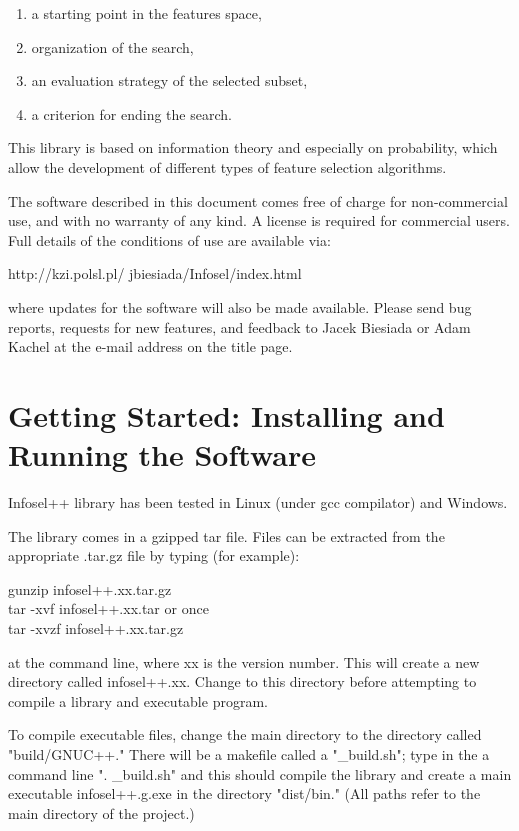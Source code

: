 \documentclass[a4paper,fleqn]{report}
\begin{document}
\begin{enumerate}
\item a starting point in the features space,
\item organization of the search,
\item an evaluation strategy of the selected subset,
\item a criterion for ending the search.
\end{enumerate}

This library is based on information theory and especially on probability, 
which allow the development of different types of feature selection algorithms.

The software described in this document comes free of charge for 
non-commercial use, and with no warranty of any kind. A license is required for commercial users.
Full details of the conditions of use are available via:
%
\begin{center}
http://kzi.polsl.pl/ jbiesiada/Infosel/index.html
\end{center}
%
where updates for the software will also be made available. 
Please send bug reports, requests for new features, and feedback 
to Jacek Biesiada or Adam Kachel at the e-mail address on the title page.


\chapter{Getting Started: Installing and Running the Software}

Infosel++ library has been tested in Linux (under gcc compilator) and Windows.

The library comes in a gzipped tar file. Files can be extracted from the appropriate
.tar.gz file by typing (for example):
\begin{center}
gunzip infosel++.xx.tar.gz \\
tar -xvf infosel++.xx.tar or once \\ 
tar -xvzf infosel++.xx.tar.gz
\end{center}
at the command line, where xx is the version number. This will create a new directory
called infosel++.xx. Change to this directory before attempting to compile
a library and executable program. 

To compile executable files, change the main directory to the directory called "build/GNUC++." 
There will be a makefile called a "\_build.sh";
type in the a command line ". \_build.sh" and this should compile the library and create a main executable
infosel++.g.exe in the directory "dist/bin." (All paths refer to the main directory of the project.)
\end{document}
